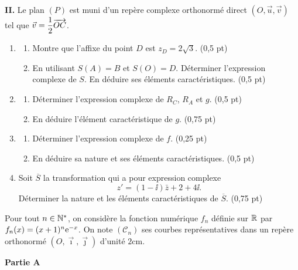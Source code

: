 \medskip
\noindent\textbf{II.} Le plan $(P)$ est muni d'un repère complexe orthonormé direct $(O,\vec{u},\vec{v})$ tel que $\vec{v} = \dfrac{1}{2}\overrightarrow{OC}$.

\begin{enumerate}
	\item
	\begin{enumerate}
		\item Montre que l'affixe du point $D$ est $z_D = 2\sqrt{3}$. \hfill (0,5 pt)
		\item En utilisant $S(A) = B$ et $S(O) = D$. Déterminer l'expression complexe de $S$. En déduire ses éléments caractéristiques. \hfill (0,5 pt)
	\end{enumerate}
	\item
	\begin{enumerate}
		\item Déterminer l'expression complexe de $R_C$, $R_A$ et $g$. \hfill (0,5 pt)
		\item En déduire l'élément caractéristique de $g$. \hfill (0,75 pt)
	\end{enumerate}
	\item
	\begin{enumerate}
		\item Déterminer l'expression complexe de $f$. \hfill (0,25 pt)
		\item En déduire sa nature et ses éléments caractéristiques. \hfill (0,5 pt)
	\end{enumerate}
	\item Soit $\overline{S}$ la transformation qui a pour expression complexe
	$$
	z' = (1-\ii)\bar{z} + 2 + 4\ii.
	$$
	Déterminer la nature et les éléments caractéristiques de $\overline{S}$. \hfill (0,75 pt)
\end{enumerate}




Pour tout $n \in \mathbb{N}^*$, on considère la fonction numérique $f_n$ définie sur $\mathbb{R}$ par $f_n(x) = (x+1)^n \mathrm{e}^{-x}$. On note $(\mathscr{C}_n)$ ses courbes représentatives dans un repère orthonormé $(O,\vec{\imath},\vec{\jmath})$ d'unité $2\text{cm}$.

\medskip
\noindent\textbf{Partie A}

